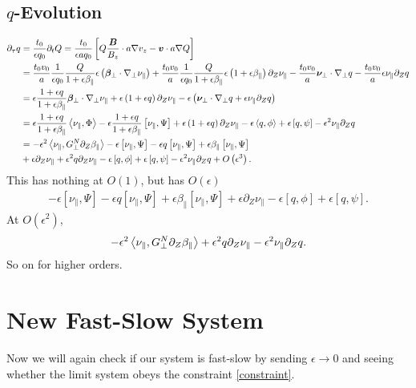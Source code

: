 \documentclass{article}
\newcommand{\para}{\parallel}
\newcommand{\ep}{\epsilon}
\newcommand{\np}{\nabla_\perp}
\newcommand{\p}{\partial}
\newcommand{\fr}{\frac{1+\ep q}{1+\ep\beta_\para}}
\newcommand{\GN}{G_\perp^N}
\newcommand{\pth} [1] {\left( #1 \right) }
\newcommand{\br} [1] {\left[ #1 \right] }
\begin{document}
\subsection{$q$-Evolution}
\begin{align} \label{qevolution} 
    \p_\tau q &= \frac{t_0}{\ep q_0} \p_tQ = \frac{t_0}{\ep a q_0} \br{Q\frac{\bm{B}}{B_z} \cdot a\nabla v_z - \bm{v}\cdot a\nabla Q} \nonumber\\ 
    &= \frac{t_0v_0}{a} \frac{1}{\ep q_0} \frac{Q}{1+\ep\beta_\para} \ep\pth{\bm{\beta}_\perp \cdot \np\nu_\para} 
    + \frac{t_0v_0}{a} \frac{1}{\ep q_0} \frac{Q}{1+\ep\beta_\para} \ep\pth{1+\ep\beta_\para} \p_Z\nu_\para
    - \frac{t_0v_0}{a} \bm{\nu}_\perp \cdot \np q - \frac{t_0v_0}{a}\ep\nu_\para \p_Z q \nonumber\\
    &= \ep\fr\bm{\beta}_\perp\cdot\np\nu_\para + \ep\pth{1+\ep q}\p_Z\nu_\para - \ep\pth{\bm{\nu}_\perp\cdot\np q + \ep\nu_\para\p_Z q} \\
    &= \ep\fr\Braket{\nu_\para, \Phi} - \ep\fr\br{\nu_\para, \Psi} + \ep\pth{1+\ep q} \p_Z\nu_\para - \ep\Braket{q, \phi} + \ep\br{q, \psi} - \ep^2\nu_\para\p_Zq \\
    &= - \ep^2\Braket{\nu_\para, \GN\p_Z\beta_\para} - \ep\br{\nu_\para, \Psi} - \ep q\br{\nu_\para, \Psi} + \ep\beta_\para\br{\nu_\para, \Psi} \\
    &+ \ep\p_Z\nu_\para + \ep^2q\p_Z\nu_\para - \ep\br{q, \phi} + \ep\br{q, \psi} - \ep^2\nu_\para\p_Zq + O\pth{\ep^3}.
\end{align}
This has nothing at $O(1)$, but has $O(\ep)$
\begin{align*}
    - \ep\br{\nu_\para, \Psi} - \ep q\br{\nu_\para, \Psi} + \ep\beta_\para\br{\nu_\para, \Psi} + \ep\p_Z\nu_\para - \ep\br{q, \phi} + \ep\br{q, \psi}.
\end{align*}
At $O\pth{\ep^2}$,
\begin{align*}
    - \ep^2\Braket{\nu_\para, \GN\p_Z\beta_\para} + \ep^2q\p_Z\nu_\para - \ep^2\nu_\para\p_Zq.
\end{align*}
So on for higher orders.



\section{New Fast-Slow System}
Now we will again check if our system is fast-slow by sending $\ep\to0$ and seeing whether the limit system obeys the constraint \ref{constraint}.
\end{document}
